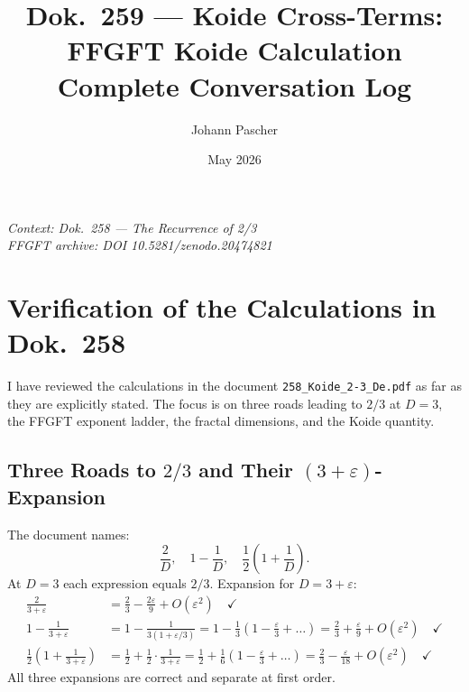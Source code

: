 
\title{Dok.~259 — Koide Cross-Terms:\\
FFGFT Koide Calculation\\[0.5em]
\large Complete Conversation Log}
\author{Johann Pascher}
\date{May 2026}
\maketitle

\begin{center}
\textit{Context: Dok.~258 --- The Recurrence of 2/3} \\[2pt]
\textit{FFGFT archive: DOI 10.5281/zenodo.20474821}
\end{center}

\tableofcontents
\newpage

\section{Verification of the Calculations in Dok.~258}

I have reviewed the calculations in the document \texttt{258\_Koide\_2-3\_De.pdf}
as far as they are explicitly stated. The focus is on three roads leading
to $2/3$ at $D=3$, the FFGFT exponent ladder, the fractal dimensions,
and the Koide quantity.

\subsection{Three Roads to $2/3$ and Their $(3+\varepsilon)$-Expansion}

The document names:
\[
  \frac{2}{D}, \quad 1-\frac{1}{D}, \quad
  \frac{1}{2}\!\left(1+\frac{1}{D}\right).
\]
At $D=3$ each expression equals $2/3$.
Expansion for $D=3+\varepsilon$:
\begin{align*}
\frac{2}{3+\varepsilon} &= \frac{2}{3}-\frac{2\varepsilon}{9}+O(\varepsilon^2) \quad\checkmark \\[4pt]
1-\frac{1}{3+\varepsilon} &= 1-\frac{1}{3(1+\varepsilon/3)}
  = 1-\tfrac{1}{3}(1-\tfrac{\varepsilon}{3}+\ldots)
  = \frac{2}{3}+\frac{\varepsilon}{9}+O(\varepsilon^2) \quad\checkmark \\[4pt]
\frac{1}{2}\!\left(1+\frac{1}{3+\varepsilon}\right)
  &= \frac{1}{2}+\frac{1}{2}\cdot\frac{1}{3+\varepsilon}
  = \frac{1}{2}+\frac{1}{6}(1-\tfrac{\varepsilon}{3}+\ldots)
  = \frac{2}{3}-\frac{\varepsilon}{18}+O(\varepsilon^2) \quad\checkmark
\end{align*}
All three expansions are correct and separate at first order.

